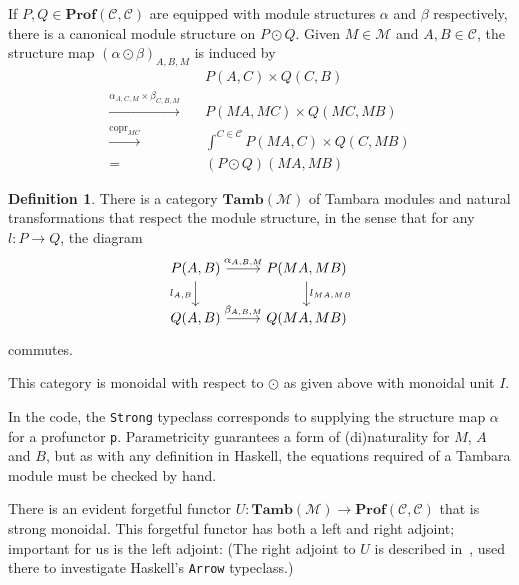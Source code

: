 \documentclass[11pt,letterpaper]{article}
\theoremstyle{plain}
\theoremstyle{definition}
\newtheorem{definition}[theorem]{Definition}
\newcommand{\C}{\mathscr{C}}
\newcommand{\M}{\mathscr{M}}
\newcommand{\Prof}{\mathbf{Prof}}
\newcommand{\Tamb}{\mathbf{Tamb}}
\DeclareMathOperator{\copr}{copr}
\begin{document}
If $P, Q \in \Prof(\C, \C)$ are equipped with module structures $\alpha$ and $\beta$ respectively, there is a canonical module structure on $P \odot Q$. Given $M \in \M$ and $A,B \in \C$, the structure map ${(\alpha \odot \beta)}_{A,B,M}$ is induced by
\begin{align*}
  &P(A,C) \times Q(C,B)  \\
  \xrightarrow{\alpha_{A,C,M} \times \beta_{C,B,M}} \quad& P(MA, MC) \times Q(MC, MB) \\
  \xrightarrow{\copr_{MC}} \quad&\int^{C \in \C} P(MA, C) \times Q(C, MB) \\
  = \quad&(P \odot Q)(MA, MB)
\end{align*}

\begin{definition}
  There is a category $\Tamb(\M)$ of Tambara modules and natural transformations that respect the module structure, in the sense that for any $l : P \to Q$, the diagram
  \[
    \begin{tikzcd}
      P(A,B) \ar[r, "\alpha_{A,B,M}"] \ar[d, "l_{A,B}" left] & P(MA, MB) \ar[d, "l_{MA, MB}" right] \\
      Q(A,B) \ar[r, "\beta_{A,B,M}"] & Q(MA, MB)
    \end{tikzcd}
  \]
  commutes.
\end{definition}

This category is monoidal with respect to $\odot$ as given above with monoidal unit $I$.

  In the code, the \texttt{Strong} typeclass corresponds to supplying the structure map $\alpha$ for a profunctor \texttt{p}. Parametricity guarantees a form of (di)naturality for $M$, $A$ and $B$, but as with any definition in Haskell, the equations required of a Tambara module must be checked by hand.

There is an evident forgetful functor $U : \Tamb(\M) \to \Prof(\C, \C)$ that is strong monoidal. This forgetful functor has both a left and right adjoint; important for us is the left adjoint: (The right adjoint to $U$ is described in~\cite{NotionsOfComputationAsMonoids}, used there to investigate Haskell's \texttt{Arrow} typeclass.)
\end{document}

